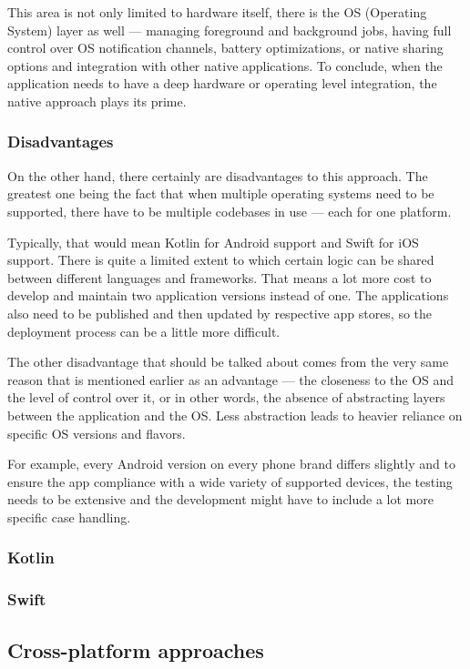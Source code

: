 \documentclass[
  digital,     %
  color,       %
  oneside,     %
  nosansbold,  %
  nocolorbold, %
  lof,         %
  lot,         %
]{fithesis4}
\begin{document}
This area is not only limited to hardware itself, there is the OS (Operating System) layer as well --- managing foreground and background jobs, having full control over OS notification channels, battery optimizations, or native sharing options and integration with other native applications. To conclude, when the application needs to have a deep hardware or operating level integration, the native approach plays its prime.

\subsubsection{Disadvantages}
On the other hand, there certainly are disadvantages to this approach. The greatest one being the fact that when multiple operating systems need to be supported, there have to be multiple codebases in use --- each for one platform. 

Typically, that would mean Kotlin for Android support and Swift for iOS support. There is quite a limited extent to which certain logic can be shared between different languages and frameworks. That means a lot more cost to develop and maintain two application versions instead of one. The applications also need to be published and then updated by respective app stores, so the deployment process can be a little more difficult.

The other disadvantage that should be talked about comes from the very same reason that is mentioned earlier as an advantage --- the closeness to the OS and the level of control over it, or in other words, the absence of abstracting layers between the application and the OS. Less abstraction leads to heavier reliance on specific OS versions and flavors. 

For example, every Android version on every phone brand differs slightly and to ensure the app compliance with a wide variety of supported devices, the testing needs to be extensive and the development might have to include a lot more specific case handling.

\subsubsection{Kotlin}
\subsubsection{Swift}
\subsection{Cross-platform approaches}
\end{document}
